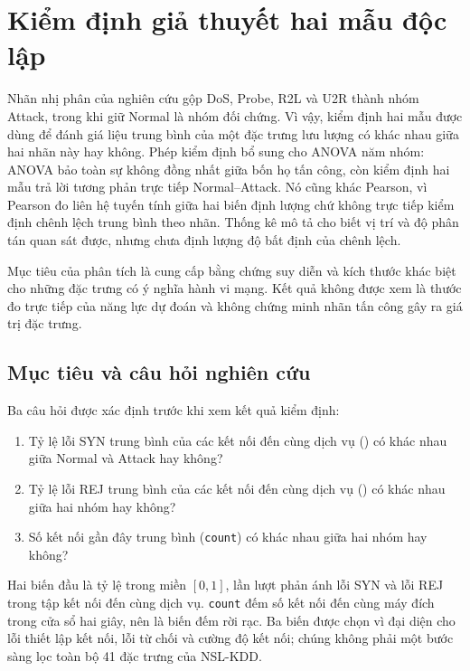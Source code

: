 \section{Kiểm định giả thuyết hai mẫu độc lập}
\label{sec:two-sample-method}

Nhãn nhị phân của nghiên cứu gộp DoS, Probe, R2L và U2R thành nhóm Attack, trong
khi giữ Normal là nhóm đối chứng. Vì vậy, kiểm định hai mẫu được dùng để đánh giá
liệu trung bình của một đặc trưng lưu lượng có khác nhau giữa hai nhãn này hay không.
Phép kiểm định bổ sung cho ANOVA năm nhóm: ANOVA bảo toàn sự không đồng nhất giữa
bốn họ tấn công, còn kiểm định hai mẫu trả lời tương phản trực tiếp Normal--Attack.
Nó cũng khác Pearson, vì Pearson đo liên hệ tuyến tính giữa hai biến định lượng chứ
không trực tiếp kiểm định chênh lệch trung bình theo nhãn. Thống kê mô tả cho biết vị
trí và độ phân tán quan sát được, nhưng chưa định lượng độ bất định của chênh lệch.

Mục tiêu của phân tích là cung cấp bằng chứng suy diễn và kích thước khác biệt cho
những đặc trưng có ý nghĩa hành vi mạng. Kết quả không được xem là thước đo trực tiếp
của năng lực dự đoán và không chứng minh nhãn tấn công gây ra giá trị đặc trưng.

\subsection{Mục tiêu và câu hỏi nghiên cứu}
\label{subsec:two-sample-rq}

Ba câu hỏi được xác định trước khi xem kết quả kiểm định:
\begin{enumerate}[label=\textbf{RQ\arabic*:},leftmargin=1.7cm]
  \item Tỷ lệ lỗi SYN trung bình của các kết nối đến cùng dịch vụ
  () có khác nhau giữa Normal và Attack hay không?
  \item Tỷ lệ lỗi REJ trung bình của các kết nối đến cùng dịch vụ
  () có khác nhau giữa hai nhóm hay không?
  \item Số kết nối gần đây trung bình (\texttt{count}) có khác nhau giữa hai nhóm
  hay không?
\end{enumerate}

Hai biến đầu là tỷ lệ trong miền $[0,1]$, lần lượt phản ánh lỗi SYN và lỗi REJ trong
tập kết nối đến cùng dịch vụ. \texttt{count} đếm số kết nối đến cùng máy đích trong
cửa sổ hai giây, nên là biến đếm rời rạc. Ba biến được chọn vì đại diện cho lỗi thiết
lập kết nối, lỗi từ chối và cường độ kết nối; chúng không phải một bước sàng lọc toàn
bộ 41 đặc trưng của NSL-KDD.

